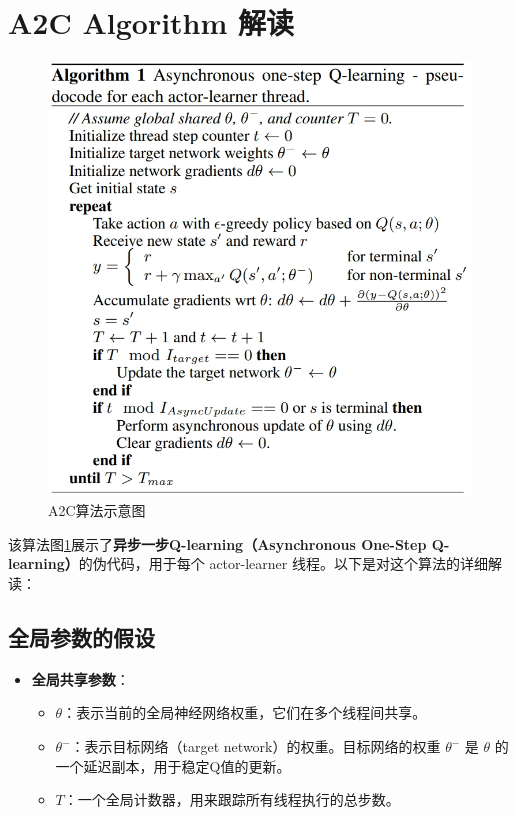 \documentclass[twocolumn, 10pt]{article} %
\theoremstyle{remark}
\begin{document}
\section{A2C Algorithm 解读}
\begin{figure}[h!]
    \centering
    \includegraphics[width=\columnwidth]{a2c_alg.png} %
    \caption{A2C算法示意图}
    \label{fig:a2c}
\end{figure}
该算法图\ref{fig:a2c}展示了\textbf{异步一步Q-learning（Asynchronous One-Step Q-learning）}的伪代码，用于每个 actor-learner 线程。以下是对这个算法的详细解读：

\subsection{全局参数的假设}
\begin{itemize}
    \item \textbf{全局共享参数}：
    \begin{itemize}
        \item \( \theta \)：表示当前的全局神经网络权重，它们在多个线程间共享。
        \item \( \theta^- \)：表示目标网络（target network）的权重。目标网络的权重 \( \theta^- \) 是 \(\theta\) 的一个延迟副本，用于稳定Q值的更新。
        \item \( T \)：一个全局计数器，用来跟踪所有线程执行的总步数。
    \end{itemize}
\end{itemize}
\end{document}
